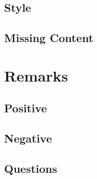 \subsection{Style} \label{sub:style}


\subsection{Missing Content} \label{sub:content}



\section{Remarks} \label{sec:remarks}


\subsection{Positive} \label{sub:positive}


\subsection{Negative} \label{sub:negative}


\subsection{Questions} \label{sub:questions2}




